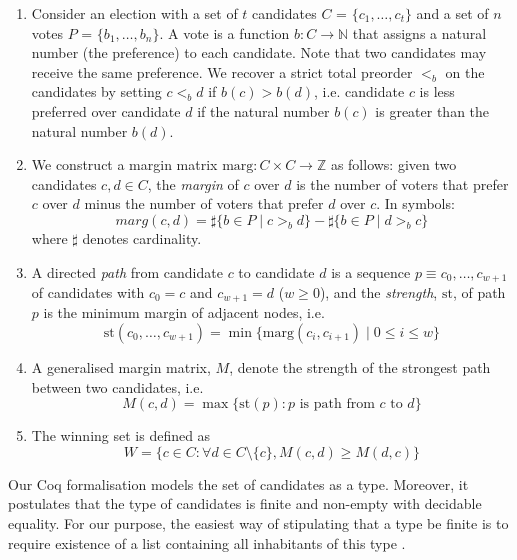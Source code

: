 \documentclass[compsoc,conference,a4paper,10pt,times]{IEEEtran}
\begin{document}
\begin{enumerate}  

\item Consider an election with a set of $t$ candidates
    $C$ = $\{c_1,\dots,c_t\}$ and 
	a set of $n$ votes $P$ = $\{b_1,\dots,b_n\}$. A vote
	is a function $b: C \rightarrow \mathbb{N}$ that 
	assigns a natural 
	number (the preference) to each candidate.  Note that two
  candidates may receive the same preference. 
	We recover a strict total 
	preorder $<_b$ on the candidates by setting $c <_b d$ if $b(c) > b(d)$, i.e. 
	candidate $c$ is less preferred over candidate $d$ if the natural number $b(c)$ is greater
	than the natural number $b(d)$. 
	
\item We construct a margin matrix $\mathrm{marg} : C \times C \to \mathbb{Z}$ as follows: 
    given two candidates $c, d \in C$, the \emph{margin} of $c$ over $d$ is
    the number of voters that prefer $c$ over $d$ minus the number of voters
    that prefer $d$ over $c$. In symbols:
\[
  \mathit{marg} (c, d) = \sharp \lbrace b \in P \mid c >_b d \rbrace -
            \sharp \lbrace b \in P \mid d >_b c \rbrace
\] where $\sharp$ denotes cardinality.


\item A directed \emph{path} from
candidate $c$ to candidate $d$ is a sequence $p \equiv c_0, \dots, c_{w+1}$
of candidates with $c_0 = c$ and $c_{w+1} = d$ ($w \geq 0$), and the
\emph{strength}, $\mathrm{st}$, of path $p$ is the minimum margin of adjacent
nodes, i.e.
\[ \mathrm{st}(c_0, \dots, c_{w+1}) = \min \lbrace \mathrm{marg} (c_i, c_{i+1}) \mid 0 
\leq i \leq w \rbrace\]
\item  A generalised margin matrix, $M$, denote the strength of the strongest path
	between two candidates, i.e. 
	\[ M(c, d) = \max \lbrace \mathrm{st} (p) : p \text{ is path from } c \text{ to } d\rbrace \]
	
\item The winning set  is defined as 
 \[ W =  \lbrace c \in C : \forall d \in C \setminus \{c\}, M (c, d) \geq M (d, c) \rbrace\]

\end{enumerate}


Our Coq formalisation models the set of candidates as a type.
Moreover, it postulates that the type of candidates 
is finite and non-empty with decidable equality.  For our purpose, 
the easiest way of stipulating that a type be finite is to require existence of a 
list containing all inhabitants of this type \cite{10.1145/2808098.2808102}.
\end{document}
